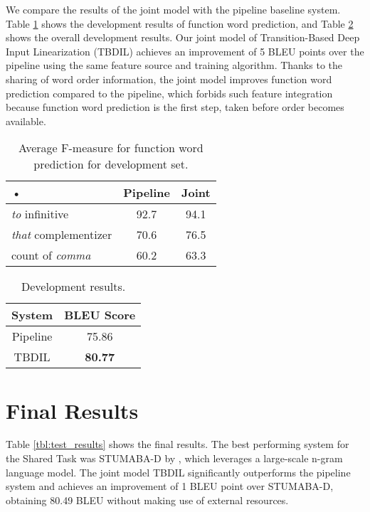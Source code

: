 \documentclass[11pt]{article}
\begin{document}
We compare the results of the joint model with the pipeline baseline system. Table \ref{tbl-dev-function-word} shows the development results of function word prediction, and Table \ref{tbl:development_results} shows the overall development results. Our joint model of Transition-Based Deep Input Linearization (TBDIL) achieves an improvement of 5 BLEU points over the pipeline using the same feature source and training algorithm. Thanks to the sharing of word order information, the joint model improves function word prediction compared to the pipeline, which forbids such feature integration because function word prediction is the first step, taken before order becomes available.

\begin{table}[t]
\centering
\small
\begin{tabular}{|l|c|c|}
\hline 
• & Pipeline & Joint \\ 
\hline 
{\it to} infinitive & 92.7 & 94.1\\ 
\hline 
{\it that} complementizer & 70.6 & 76.5\\ 
\hline 
count of {\it comma} & 60.2 & 63.3 \\ 
\hline 
\end{tabular} 
\caption{Average F-measure for function word prediction for development set.}
\label{tbl-dev-function-word}
\end{table}

\begin{table}[t]
\centering
\small
\begin{tabular}{|c|c|}
\hline 
System & BLEU Score \\ 
\hline 
Pipeline &  75.86\\ 
\hline 
TBDIL &\textbf{80.77} \\ 
\hline 
\end{tabular} 
\caption{Development results.}
\label{tbl:development_results}
\end{table}
\section{Final Results}
Table \ref{tbl:test_results} shows the final results. The best performing system for the Shared Task was STUMABA-D by , which leverages a large-scale n-gram language model. The joint model TBDIL significantly outperforms the pipeline system and achieves an improvement of 1 BLEU point over STUMABA-D, obtaining 80.49 BLEU without making use of external resources.
\end{document}
